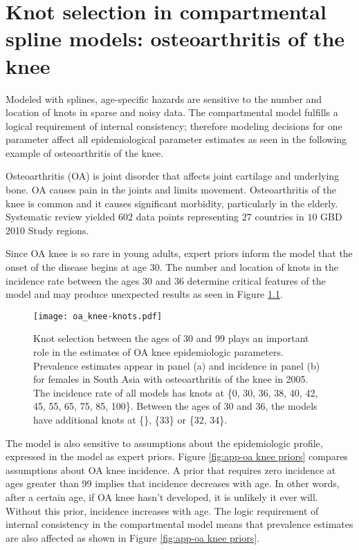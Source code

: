 \chapter{Knot selection in compartmental spline models: osteoarthritis of the knee}
\label{applications-con_fit_splines}

Modeled with splines, age-specific hazards are sensitive to the number
and location of knots in sparse and noisy data.  The compartmental
model fulfills a logical requirement of internal consistency;
therefore modeling decisions for one parameter affect all
epidemiological parameter estimates as seen in the following example
of osteoarthritis of the knee.

Osteoarthritis (OA) is joint disorder that affects joint cartilage and
underlying bone.  OA causes pain in the joints and limits movement.
Osteoarthritis of the knee is common and it causes significant
morbidity, particularly in the
elderly. \cite{felson_epidemiology_1988, felson_incidence_1995}
Systematic review yielded $602$ data points representing $27$ countries
in $10$ GBD 2010 Study regions.

Since OA knee is so rare in young adults, expert priors inform the
model that the onset of the disease begins at age 30.  The number and
location of knots in the incidence rate between the ages 30 and 36
determine critical features of the model and may produce unexpected
results as seen in Figure \ref{fig:app-oa knee knots}.

    \begin{figure}[h]
        \begin{center}
            \texttt{[image: oa\_knee-knots.pdf]}
            \caption{Knot selection between the ages of 30 and 99
              plays an important role in the estimates of OA knee
              epidemiologic parameters.  Prevalence estimates appear
              in panel (a) and incidence in panel (b) for females in
              South Asia with osteoarthritis of the knee in 2005.  The
              incidence rate of all models has knots at \{0, 30, 36,
              38, 40, 42, 45, 55, 65, 75, 85, 100\}.  Between the ages
              of 30 and 36, the models have additional knots at \{\}, \{33\}
              or \{32, 34\}.}
            \label{fig:app-oa knee knots}
        \end{center}
    \end{figure}

The model is also sensitive to assumptions about the epidemiologic
profile, expressed in the model as expert priors.  Figure
\ref{fig:app-oa knee priors} compares assumptions about OA knee
incidence.  A prior that requires zero incidence at ages greater than
99 implies that incidence decreases with age.  In other words, after a
certain age, if OA knee hasn't developed, it is unlikely it ever
will. Without this prior, incidence increases with age.  The logic
requirement of internal consistency in the compartmental model means
that prevalence estimates are also affected as shown in Figure
\ref{fig:app-oa knee priors}.

